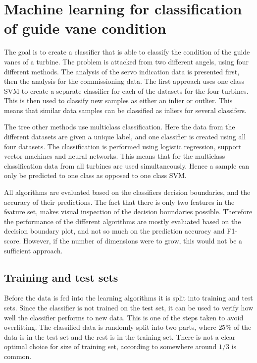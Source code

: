 


\section{Machine learning for classification of guide vane condition}
    The goal is to create a classifier that is able to classify the condition of the guide vanes of a turbine. The problem is attacked from two different angels, using four different methods. The analysis of the servo indication data is presented first, then the analysis for the commissioning data. The first approach uses one class SVM to create a separate classifier for each of the datasets for the four turbines. This is then used to classify new samples as either an inlier or outlier. This means that similar data samples can be classified as inliers for several classifers. 
    
    The tree other methods use multiclass classification. Here the data from the different datasets are given a unique label, and one classifier is created using all four datasets. The classification is performed using logistic regression, support vector machines and neural networks. This means that for the multiclass classification data from all turbines are used simultaneously. Hence a sample can only be predicted to one class as opposed to one class SVM.
    
    All algorithms are evaluated based on the classifiers decision boundaries, and the accuracy of their predictions. The fact that there is only two features in the feature set, makes visual inspection of the decision boundaries possible. Therefore the performance of the different algorithms are mostly evaluated based on the decision boundary plot, and not so much on the prediction accuracy and F1-score. However, if the number of dimensions were to grow, this would not be a sufficient approach.
    
    
    \subsection{Training and test sets}
        Before the data is fed into the learning algorithms it is split into training and test sets. Since the classifier is not trained on the test set, it can be used to verify how well the classifier performs to new data. This is one of the steps taken to avoid overfitting. The classified data is randomly split into two parts, where $ 25\%$ of the data is in the test set and the rest is in the training set. There is not a clear optimal choice for size of training set, according to \cite{Kohavi1995} somewhere around $1/3$ is common.   
        
